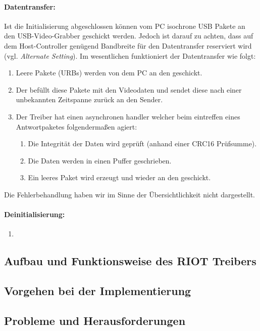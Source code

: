 \paragraph{Datentransfer:} Ist die Initialisierung abgeschlossen können vom PC isochrone USB Pakete an den USB-Video-Grabber
geschickt werden. Jedoch ist darauf zu achten, dass auf dem Host-Controller genügend Bandbreite für den Datentransfer reserviert wird
(vgl. \emph{Alternate Setting}). Im wesentlichen funktioniert der Datentransfer wie folgt:
\begin{enumerate}
 \item Leere Pakete (URBs) werden von dem PC an den \stk{} geschickt.
 \item Der \stk{} befüllt diese Pakete mit den Videodaten und sendet diese nach einer unbekannten Zeitspanne zurück an den Sender.
 \item Der Treiber hat einen asynchronen handler welcher beim eintreffen eines Antwortpaketes folgendermaßen agiert:
 \begin{enumerate}
  \item Die Integrität der Daten wird geprüft (anhand einer CRC16 Prüfsumme).
  \item Die Daten werden in einen Puffer geschrieben.
  \item Ein leeres Paket wird erzeugt und wieder an den \stk{} geschickt. 
 \end{enumerate}
\end{enumerate}
Die Fehlerbehandlung haben wir im Sinne der Übersichtlichkeit nicht dargestellt.

\paragraph{Deinitialisierung:}
\begin{enumerate}
 \item 
\end{enumerate}


\subsection{Aufbau und Funktionsweise des RIOT Treibers}


\subsection{Vorgehen bei der Implementierung}

\subsection{Probleme und Herausforderungen}

